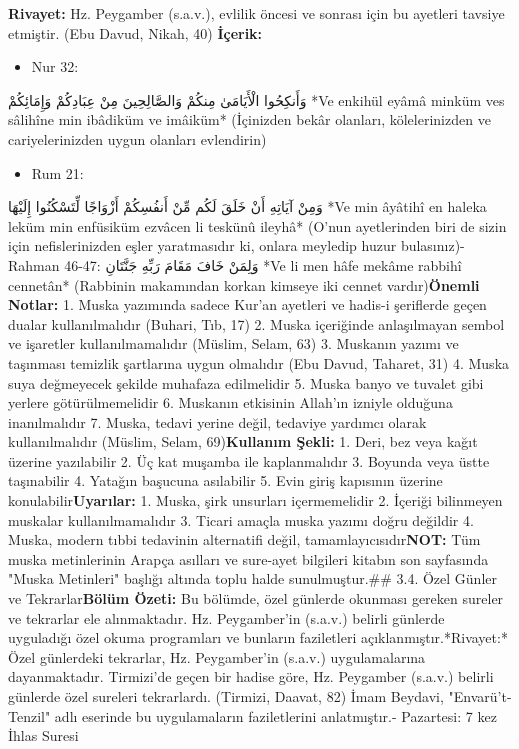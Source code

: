 \documentclass[12pt,a4paper]{article}
\begin{document}
\textbf{Rivayet:} Hz. Peygamber (s.a.v.), evlilik öncesi ve sonrası için bu ayetleri tavsiye etmiştir. (Ebu Davud, Nikah, 40)
\textbf{İçerik:}
\begin{itemize}
\item Nur 32:
\end{itemize}
وَأَنكِحُوا الْأَيَامَىٰ مِنكُمْ وَالصَّالِحِينَ مِنْ عِبَادِكُمْ وَإِمَائِكُمْ
*Ve enkihül eyâmâ minküm ves sâlihîne min ibâdiküm ve imâiküm*
(İçinizden bekâr olanları, kölelerinizden ve cariyelerinizden uygun olanları evlendirin)
\begin{itemize}
\item Rum 21:
\end{itemize}
وَمِنْ آيَاتِهِ أَنْ خَلَقَ لَكُم مِّنْ أَنفُسِكُمْ أَزْوَاجًا لِّتَسْكُنُوا إِلَيْهَا
*Ve min âyâtihî en haleka leküm min enfüsiküm ezvâcen li teskünû ileyhâ*
(O'nun ayetlerinden biri de sizin için nefislerinizden eşler yaratmasıdır ki, onlara meyledip huzur bulasınız)- Rahman 46-47:
وَلِمَنْ خَافَ مَقَامَ رَبِّهِ جَنَّتَانِ
*Ve li men hâfe mekâme rabbihî cennetân*
(Rabbinin makamından korkan kimseye iki cennet vardır)\textbf{Önemli Notlar:}
1. Muska yazımında sadece Kur'an ayetleri ve hadis-i şeriflerde geçen dualar kullanılmalıdır (Buhari, Tıb, 17)
2. Muska içeriğinde anlaşılmayan sembol ve işaretler kullanılmamalıdır (Müslim, Selam, 63)
3. Muskanın yazımı ve taşınması temizlik şartlarına uygun olmalıdır (Ebu Davud, Taharet, 31)
4. Muska suya değmeyecek şekilde muhafaza edilmelidir
5. Muska banyo ve tuvalet gibi yerlere götürülmemelidir
6. Muskanın etkisinin Allah'ın izniyle olduğuna inanılmalıdır
7. Muska, tedavi yerine değil, tedaviye yardımcı olarak kullanılmalıdır (Müslim, Selam, 69)\textbf{Kullanım Şekli:}
1. Deri, bez veya kağıt üzerine yazılabilir
2. Üç kat muşamba ile kaplanmalıdır
3. Boyunda veya üstte taşınabilir
4. Yatağın başucuna asılabilir
5. Evin giriş kapısının üzerine konulabilir\textbf{Uyarılar:}
1. Muska, şirk unsurları içermemelidir
2. İçeriği bilinmeyen muskalar kullanılmamalıdır
3. Ticari amaçla muska yazımı doğru değildir
4. Muska, modern tıbbi tedavinin alternatifi değil, tamamlayıcısıdır\textbf{NOT:} Tüm muska metinlerinin Arapça asılları ve sure-ayet bilgileri kitabın son sayfasında "Muska Metinleri" başlığı altında toplu halde sunulmuştur.\#\# 3.4. Özel Günler ve Tekrarlar\textbf{Bölüm Özeti:}
Bu bölümde, özel günlerde okunması gereken sureler ve tekrarlar ele alınmaktadır. Hz. Peygamber'in (s.a.v.) belirli günlerde uyguladığı özel okuma programları ve bunların faziletleri açıklanmıştır.*Rivayet:* Özel günlerdeki tekrarlar, Hz. Peygamber'in (s.a.v.) uygulamalarına dayanmaktadır. Tirmizi'de geçen bir hadise göre, Hz. Peygamber (s.a.v.) belirli günlerde özel sureleri tekrarlardı. (Tirmizi, Daavat, 82) İmam Beydavi, "Envarü't-Tenzil" adlı eserinde bu uygulamaların faziletlerini anlatmıştır.- Pazartesi: 7 kez İhlas Suresi
\end{document}
